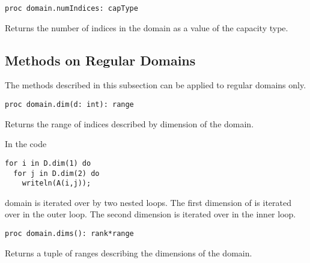 \begin{protohead}
\begin{verbatim}
proc domain.numIndices: capType
\end{verbatim}
\end{protohead}
\begin{protobody}
Returns the number of indices in the domain as a value of the capacity type.
\end{protobody}

\subsection{Methods on Regular Domains}

The methods described in this subsection can be applied to regular domains only.

\begin{protohead}
\begin{verbatim}
proc domain.dim(d: int): range
\end{verbatim}
\end{protohead}
\begin{protobody}
Returns the range of indices described by dimension  of the
domain.
\end{protobody}

\begin{example}
In the code
\begin{chapel}
\begin{verbatim}
for i in D.dim(1) do
  for j in D.dim(2) do
    writeln(A(i,j));
\end{verbatim}
\end{chapel}
domain  is iterated over by two nested loops.  The first
dimension of  is iterated over in the outer loop.  The second
dimension is iterated over in the inner loop.
\end{example}

\begin{protohead}
\begin{verbatim}
proc domain.dims(): rank*range
\end{verbatim}
\end{protohead}
\begin{protobody}
Returns a tuple of ranges describing the dimensions of the domain.
\end{protobody}

